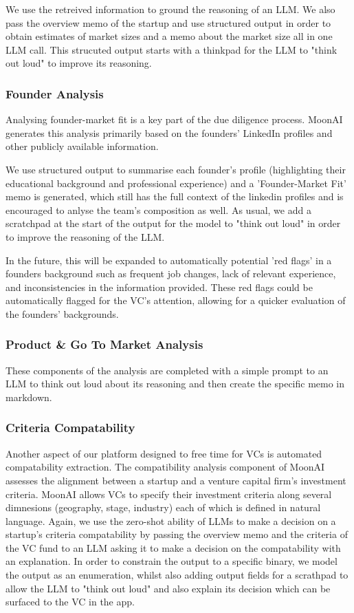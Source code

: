 \documentclass[a4paper, oneside]{discothesis}
\begin{document}
We use the retreived information to ground the reasoning of an LLM. We also pass the overview memo of the startup and use structured output in order to obtain estimates of market sizes and a memo about the market size all in one LLM call. This strucuted output starts with a thinkpad for the LLM to "think out loud" to improve its reasoning.

\subsubsection{Founder Analysis}
Analysing founder-market fit is a key part of the due diligence process. MoonAI generates this analysis primarily based on the founders' LinkedIn profiles and other publicly available information. 

We use structured output to summarise each founder's profile (highlighting their educational background and professional experience) and  a 'Founder-Market Fit' memo is generated, which still has the full context of the linkedin profiles and is encouraged to anlyse the team's composition as well. As usual, we add a scratchpad at the start of the output for the model to "think out loud" in order to improve the reasoning of the LLM. 

In the future, this will be expanded to automatically potential 'red flags' in a founders background such as frequent job changes, lack of relevant experience, and inconsistencies in the information provided. These red flags could be automatically flagged for the VC's attention, allowing for a quicker evaluation of the founders' backgrounds.

\subsubsection{Product \& Go To Market Analysis}
These components of the analysis are completed with a simple prompt to an LLM to think out loud about its reasoning and then create the specific memo in markdown.

\subsubsection{Criteria Compatability}
Another aspect of our platform designed to free time for VCs is automated compatability extraction. The compatibility analysis component of MoonAI assesses the alignment between a startup and a venture capital firm's investment criteria. MoonAI allows VCs to specify their investment criteria along several dimnesions (geography, stage, industry) each of which is defined in natural language. Again, we use the zero-shot ability of LLMs to make a decision on a startup's criteria compatability by passing the overview memo and the criteria of the VC fund to an LLM asking it to make a decision on the compatability with an explanation. In order to constrain the output to a specific binary, we model the output as an enumeration, whilst also adding output fields for a scrathpad to allow the LLM to "think out loud" and also explain its decision which can be surfaced to the VC in the app. 
\end{document}
